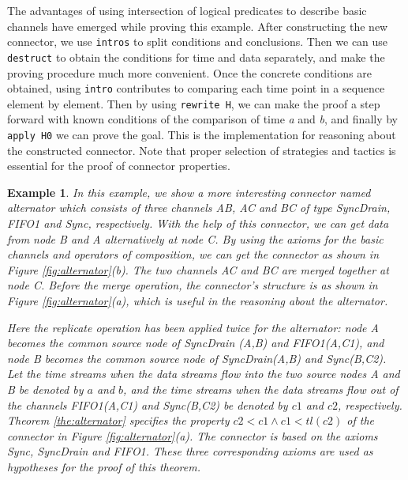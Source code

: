 \documentclass[preprint,3p]{elsarticle}
\newtheorem{example}{Example}[section]
\begin{document}
The advantages of using intersection of logical predicates to describe basic channels have emerged while proving this example.
After constructing the new connector, we use \texttt{intros} to split conditions and conclusions. Then we can use \texttt{destruct} to obtain the conditions for time and data separately,
and make the proving procedure much more convenient. Once the concrete conditions are obtained, using \texttt{intro}
contributes to comparing each time point in a sequence element by element. Then by using \texttt{rewrite H}, we can make
the proof a step forward with known conditions of the comparison of time \emph{a} and \emph{b}, and finally by
\texttt{apply H0} we can prove the goal. This is the implementation for reasoning about the constructed connector.
Note that proper selection of strategies and tactics is essential for the proof of connector properties.


\begin{example}\label{ex:alternator}
In this example, we show a more interesting connector named \emph{alternator} which consists of three channels \emph{AB}, \emph{AC} and \emph{BC} of type SyncDrain, FIFO1 and Sync, respectively. With the help of this connector, we can get data from node \emph{B} and \emph{A} alternatively at node \emph{C}.
By using the axioms for the basic channels and operators of composition, we can get the connector as shown in Figure \ref{fig:alternator}(b). The two
channels \emph{AC} and \emph{BC} are merged together at node \emph{C}. Before the merge operation, the connector's structure is as shown in
Figure \ref{fig:alternator}(a), which is useful in the reasoning about the alternator.

Here the replicate operation has been applied twice for the alternator: node \emph{A} becomes the common source node of \emph{SyncDrain (A,B)} and \emph{FIFO1(A,C1)}, and node \emph{B} becomes the common source node of \emph{SyncDrain(A,B)} and \emph{Sync(B,C2)}. Let the time streams when the
data streams flow into the two source nodes \emph{A} and \emph{B} be denoted by $a$ and $b$, and the time streams when the data streams
flow out of the channels \emph{FIFO1(A,C1)} and \emph{Sync(B,C2)} be denoted by $c1$ and $c2$, respectively. Theorem \ref{the:alternator}
specifies the property $c2<c1 \wedge c1<tl (c2)$ of the connector in Figure \ref{fig:alternator}(a). The connector is based on the axioms
Sync, SyncDrain and FIFO1. These three corresponding axioms are used as hypotheses for the proof of this theorem.
\end{example}
\end{document}
